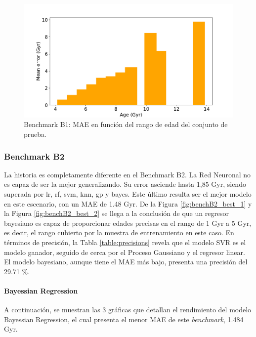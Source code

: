 \begin{figure}[H]
\begin{center}
 \includegraphics[width=0.8\linewidth]{Figuras/Experimentos/B_B1_nnet_3.pdf}
\end{center}
\caption{Benchmark B1: MAE en función del rango de edad del conjunto de prueba.}
 \label{fig:benchB1_best_3}
\end{figure}

\subsubsection{Benchmark B2} 

La historia es completamente diferente en el Benchmark B2. La Red Neuronal no es capaz de ser la mejor generalizando. Su error asciende hasta 1,85 Gyr, siendo superada por lr, rf, svm, knn, gp y bayes. %
Este último resulta ser el mejor modelo en este escenario, con un MAE de 1.48 Gyr. De la Figura \ref{fig:benchB2_best_1} y la Figura \ref{fig:benchB2_best_2} se llega a la conclusión de que un regresor bayesiano es capaz de proporcionar edades precisas en el rango de 1 Gyr a 5 Gyr, es decir, el rango cubierto por la muestra de entrenamiento en este caso. En términos de precisión, la Tabla \ref{table:precisions} revela que el modelo SVR es el modelo ganador, seguido de cerca por el Proceso Gaussiano y el regresor linear. El modelo bayesiano, aunque tiene el MAE más bajo, presenta una precisión del 29.71 \%.

\paragraph{Bayessian Regression} 
A continuación, se muestran las 3 gráficas que detallan el rendimiento del modelo Bayessian Regression, el cual presenta el menor MAE de este \emph{benchmark}, 1.484 Gyr. %

